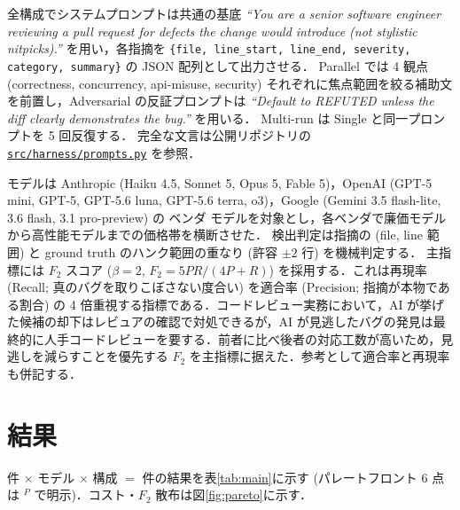 \documentclass[a4j]{jarticle}
\begin{document}
全構成でシステムプロンプトは共通の基底 \textit{``You are a senior software engineer reviewing a pull request for defects the change would introduce (not stylistic nitpicks).''} を用い，各指摘を \texttt{\{file, line\_start, line\_end, severity, category, summary\}} の JSON 配列として出力させる．
Parallel では 4 観点 (correctness, concurrency, api-misuse, security) それぞれに焦点範囲を絞る補助文を前置し，Adversarial の反証プロンプトは \textit{``Default to REFUTED unless the diff clearly demonstrates the bug.''} を用いる．
Multi-run は Single と同一プロンプトを 5 回反復する．
完全な文言は公開リポジトリの \href{https://github.com/hiroaki222/review-orchestration-bench/blob/main/src/harness/prompts.py}{\texttt{src/harness/prompts.py}} を参照．

モデルは Anthropic (Haiku 4.5, Sonnet 5, Opus 5, Fable 5)，OpenAI (GPT-5 mini, GPT-5, GPT-5.6 luna, GPT-5.6 terra, o3)，Google (Gemini 3.5 flash-lite, 3.6 flash, 3.1 pro-preview) の \nVendors{} ベンダ \nModels{} モデルを対象とし，各ベンダで廉価モデルから高性能モデルまでの価格帯を横断させた．
検出判定は指摘の (file, line 範囲) と ground truth のハンク範囲の重なり (許容 $\pm 2$ 行) を機械判定する．
主指標には $F_2$ スコア ($\beta = 2$, $F_2 = 5PR / (4P + R)$) を採用する．これは再現率 (Recall; 真のバグを取りこぼさない度合い) を適合率 (Precision; 指摘が本物である割合) の 4 倍重視する指標である．コードレビュー実務において，AI が挙げた候補の却下はレビュアの確認で対処できるが，AI が見逃したバグの発見は最終的に人手コードレビューを要する．前者に比べ後者の対応工数が高いため，見逃しを減らすことを優先する $F_2$ を主指標に据えた．参考として適合率と再現率も併記する．

\section{結果}

\nItems{} 件 $\times$ \nModels{} モデル $\times$ \nConfigs{} 構成 $=$ \nCombos{} 件の結果を表\ref{tab:main}に示す (パレートフロント 6 点は $^{P}$ で明示)．コスト・$F_2$ 散布は図\ref{fig:pareto}に示す．

\begin{table}[!t]
  \centering
  \caption{構成別の検出性能とコスト (各セル 30 件平均，$N=30$)．太字はモデル内最高 $F_2$，下線付き太字は全体最高，$^{P}$ はパレートフロント (図\ref{fig:pareto}と対応)．略号: Sin = Single, Par = Parallel, Adv = Adversarial, MR = Multi-run．}
  \label{tab:main}
  \scriptsize
  \setlength{\tabcolsep}{2pt}
  \resizebox{\linewidth}{!}{}
\end{table}
\end{document}
